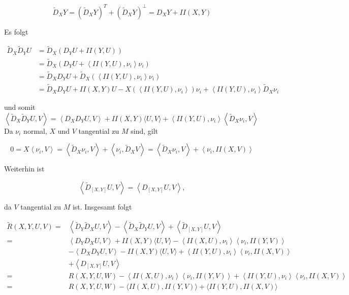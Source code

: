 \documentclass[10pt, letterpaper]{article}
\begin{document}
$$
\tilde{D}_{X} Y=\left(\tilde{D}_{X} Y\right)^{T}+\left(\tilde{D}_{X} Y\right)^{\perp}=D_{X} Y+I I(X, Y)
$$

Es folgt

$$
\begin{aligned}
\tilde{D}_{X} \tilde{D}_{Y} U & =\tilde{D}_{X}\left(D_{Y} U+I I(Y, U)\right) \\
& =\tilde{D}_{X}\left(D_{Y} U+\left\langle I I(Y, U), \nu_{i}\right\rangle \nu_{i}\right) \\
& =\tilde{D}_{X} D_{Y} U+\tilde{D}_{X}\left(\left\langle I I(Y, U), \nu_{i}\right\rangle \nu_{i}\right) \\
& =\tilde{D}_{X} D_{Y} U+I I(X, Y) U-X\left(\left\langle I I(Y, U), \nu_{i}\right\rangle\right) \nu_{i}+\left\langle I I(Y, U), \nu_{i}\right\rangle \tilde{D}_{X} \nu_{i}
\end{aligned}
$$

und somit\\
$\left\langle\tilde{D}_{X} \tilde{D}_{Y} U, V\right\rangle=\left\langle D_{X} D_{Y} U, V\right\rangle+I I(X, Y)\langle U, V\rangle+\left\langle I I(Y, U), \nu_{i}\right\rangle\left\langle\tilde{D}_{X} \nu_{i}, V\right\rangle$\\
Da $\nu_{i}$ normal, $X$ und $V$ tangential zu $M$ sind, gilt

$$
0=X\left\langle\nu_{i}, V\right\rangle=\left\langle\tilde{D}_{X} \nu_{i}, V\right\rangle+\left\langle\nu_{i}, \tilde{D}_{X} V\right\rangle=\left\langle\tilde{D}_{X} \nu_{i}, V\right\rangle+\left\langle\nu_{i}, I I(X, V)\right\rangle
$$

Weiterhin ist

$$
\left\langle\tilde{D}_{[X, Y]} U, V\right\rangle=\left\langle D_{[X, Y]} U, V\right\rangle,
$$

da $V$ tangential zu $M$ ist. Insgesamt folgt

$$
\begin{aligned}
\tilde{R}(X, Y, U, V)= & \left\langle\tilde{D}_{Y} \tilde{D}_{X} U, V\right\rangle-\left\langle\tilde{D}_{X} \tilde{D}_{Y} U, V\right\rangle+\left\langle\tilde{D}_{[X, Y]} U, V\right\rangle \\
= & \left\langle D_{Y} D_{X} U, V\right\rangle+I I(X, Y)\langle U, V\rangle-\left\langle I I(X, U), \nu_{i}\right\rangle\left\langle\nu_{i}, I I(Y, V)\right\rangle \\
& -\left\langle D_{X} D_{Y} U, V\right\rangle-I I(X, Y)\langle U, V\rangle+\left\langle I I(Y, U), \nu_{i}\right\rangle\left\langle\nu_{i}, I I(X, V)\right\rangle \\
& +\left\langle D_{[X, Y]} U, V\right\rangle \\
= & R(X, Y, U, W)-\left\langle I I(X, U), \nu_{i}\right\rangle\left\langle\nu_{i}, I I(Y, V)\right\rangle+\left\langle I I(Y, U), \nu_{i}\right\rangle\left\langle\nu_{i}, I I(X, V)\right\rangle \\
= & R(X, Y, U, W)-\langle I I(X, U), I I(Y, V)\rangle+\langle I I(Y, U), I I(X, V)\rangle
\end{aligned}
$$
\end{document}
